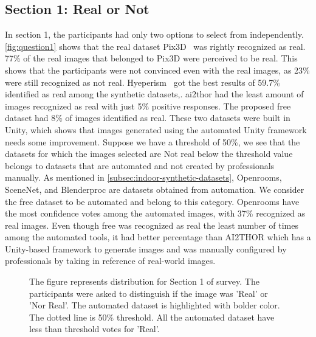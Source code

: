 \subsection{Section 1: Real or Not}
In section 1, the participants had only two options to select from independently.
\autoref{fig:question1} shows that the real dataset Pix3D~\cite{Sun2018} was rightly recognized as real.
77\% of the real images that belonged to Pix3D were perceived to be real.
This shows that the participants were not convinced even with the real images, as 23\% were still recognized as not real.
Hyeperism~\cite{Roberts2020HypersimAP} got the best results of 59.7\% identified as real among the synthetic datasets,.
\gls{ai2thor} had the least amount of images recognized as real with just 5\% positive responses.
The proposed \gls{free} dataset had 8\% of images identified as real.
These two datasets were built in Unity, which shows that images generated using the automated Unity framework needs some improvement.
Suppose we have a threshold of 50\%, we see that the datasets for which the images selected are Not real below the threshold value belongs to datasets that are automated and not created by professionals manually.
As mentioned in \autoref{subsec:indoor-synthetic-datasets}, Openrooms, SceneNet, and Blenderproc are datasets obtained from automation.
We consider the \gls{free} dataset to be automated and belong to this category.
Openrooms have the most confidence votes among the automated images, with 37\% recognized as real images.
Even though \gls{free} was recognized as real the least number of times among the automated tools, it had better percentage than AI2THOR
which has a Unity-based framework to generate images and was manually configured by professionals by taking in reference of real-world images.

\begin{figure}
    \centering
    \resizebox{\textwidth}{!}{}
    \caption[Distibution for Survey:Section 1]{The figure represents distribution for Section 1 of survey. The participants were asked to distinguish if the image was 'Real' or 'Nor Real'.
    The automated dataset is highlighted with bolder color. The dotted line is 50\% threshold. All the automated dataset have less than threshold votes for 'Real'.}
    \label{fig:question1}
\end{figure}

